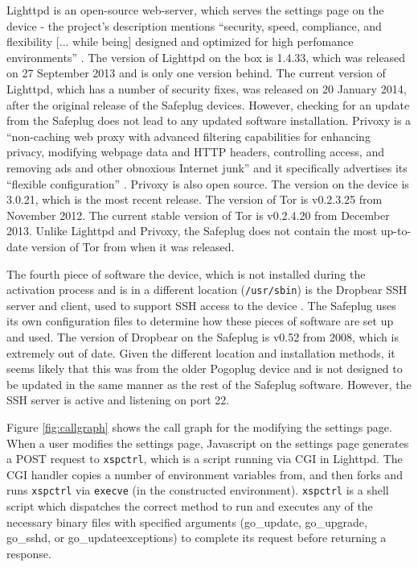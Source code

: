 \documentclass[conference]{IEEEtran}
\begin{document}
Lighttpd is an open-source web-server, which serves the settings page on the device - the project's description mentions ``security, speed, compliance, and flexibility [... while being] designed and optimized for high perfomance environments'' \cite{lighttpd}.  The version of Lighttpd on the box is 1.4.33, which was released on 27 September 2013 and is only one version behind.  The current version of Lighttpd, which has a number of security fixes, was released on 20 January 2014, after the original release of the Safeplug devices.  However, checking for an update from the Safeplug does not lead to any updated software installation.  Privoxy is a ``non-caching web proxy with advanced filtering capabilities for enhancing privacy, modifying webpage data and HTTP headers, controlling access, and removing ads and other obnoxious Internet junk'' and it specifically advertises its ``flexible configuration'' \cite{privoxy}.  Privoxy is also open source.  The version on the device is 3.0.21, which is the most recent release. The version of Tor is v0.2.3.25 from November 2012.  The current stable version of Tor is v0.2.4.20 from December 2013.  Unlike Lighttpd and Privoxy, the Safeplug does not contain the most up-to-date version of Tor from when it was released.

The fourth piece of software the device, which is not installed during the activation process and is in a different location (\verb!/usr/sbin!) is the Dropbear SSH server and client, used to support SSH access to the device \cite{dropbear}.  The Safeplug uses its own configuration files to determine how these pieces of software are set up and used.  The version of Dropbear on the Safeplug is v0.52 from 2008, which is extremely out of date.  Given the different location and installation methods, it seems likely that this was from the older Pogoplug device and is not designed to be updated in the same manner as the rest of the Safeplug software.  However, the SSH server is active and listening on port 22.

Figure \ref{fig:callgraph} shows the call graph for the modifying the settings page.  When a user modifies the settings page, Javascript on the settings page generates a POST request to {\tt xspctrl}, which is a script running via CGI in Lighttpd. The CGI handler copies a number of environment variables from, and then forks and runs {\tt xspctrl} via {\tt execve} (in the constructed environment). {\tt xspctrl} is a shell script which dispatches the correct method to run and executes any of the necessary binary files with specified arguments (go\_update, go\_upgrade, go\_sshd, or go\_updateexceptions) to complete its request before returning a response.
\end{document}

